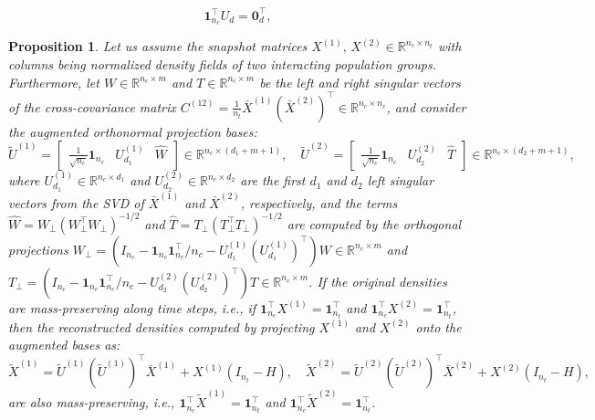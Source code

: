 \documentclass[10pt,a4paper]{amsart}
\newtheorem{prop}{Proposition}
\begin{document}
\begin{equation} \label{eq:ortho1a}
    \mathbf{1}_{n_c}^\top U_d = \boldsymbol{0}^\top_d,
\end{equation}

\begin{prop} \label{prop:2}
Let us assume the snapshot matrices $X^{(1)},\, X^{(2)} \in\mathbb{R}^{n_c \times n_t}$ with columns being normalized density fields of two interacting population groups. Furthermore, let $W\in \mathbb{R}^{n_c \times m}$ and $T \in \mathbb{R}^{n_c \times m}$ be the left and right singular vectors of the cross-covariance matrix $C^{(12)}=\frac{1}{n_t}\bar X^{(1)} \left(\bar X^{(2)}\right)^\top \in \mathbb{R}^{n_c\times n_c}$, and consider the augmented orthonormal projection bases: 
\begin{equation} \label{eq:Aug_Basis}
    \tilde U^{(1)} = \begin{bmatrix} \frac{1}{\sqrt{n_c}}\mathbf{1}_{n_c} & U_{d_1}^{(1)} & \hat W \end{bmatrix} \in \mathbb{R}^{n_c \times (d_1+m+1)}, \quad
\tilde U^{(2)} = \begin{bmatrix} \frac{1}{\sqrt{n_c}}\mathbf{1}_{n_c} & U_{d_2}^{(2)} & \hat T \end{bmatrix} \in \mathbb{R}^{n_c \times (d_2+m+1)},
\end{equation} 
where $U_{d_1}^{(1)} \in \mathbb{R}^{n_c\times d_1}$ and $U_{d_2}^{(2)} \in \mathbb{R}^{n_c\times d_2}$ are the first $d_1$ and $d_2$ left singular vectors from the SVD of $\bar X^{(1)}$ and $\bar X^{(2)}$, respectively, and the terms $\hat W = W_\perp (W_\perp^\top W_\perp)^{-1/2}$ and $\hat T = T_\perp (T_\perp^\top T_\perp)^{-1/2}$ are computed by the orthogonal projections $W_\perp = \left(I_{n_c} - \mathbf{1}_{n_c}\mathbf{1}^{\top}_{n_c}/n_c - U_{d_1}^{(1)} (U_{d_1}^{(1)})^\top\right)W \in \mathbb{R}^{n_c\times m}$ and $T_\perp = \left(I_{n_c} - \mathbf{1}_{n_c}\mathbf{1}^{\top}_{n_c}/n_c- U_{d_2}^{(2)} (U_{d_2}^{(2)})^\top\right)T \in \mathbb{R}^{n_c\times m}$. If the original densities are mass-preserving along time steps, i.e., if $\mathbf{1}^{\top}_{n_c}X^{(1)}=\mathbf{1}^{\top}_{n_{t}}$ and $\mathbf{1}^{\top}_{n_c}X^{(2)}=\mathbf{1}^{\top}_{n_{t}}$, then the reconstructed densities computed by projecting $X^{(1)}$ and $X^{(2)}$ onto the augmented bases as: 
\begin{equation}
    \tilde X^{(1)}=\tilde {U}^{(1)} \left(\tilde {U}^{(1)}\right)^{\top} \bar X^{(1)}+X^{(1)} (I_{n_t}-H), \quad \tilde X^{(2)}=\tilde {U}^{(2)} \left(\tilde {U}^{(2)}\right)^{\top} \bar X^{(2)}+X^{(2)} (I_{n_t}-H),
    \label{Eq:Reconstruction_agumented}
\end{equation}
are also mass-preserving, i.e., $\mathbf{1}^{\top}_{n_c}\tilde X^{(1)}=\mathbf{1}^{\top}_{n_{t}}$ and $\mathbf{1}^{\top}_{n_c} \tilde X^{(2)}=\mathbf{1}^{\top}_{n_{t}}$.
\end{prop}
\end{document}
